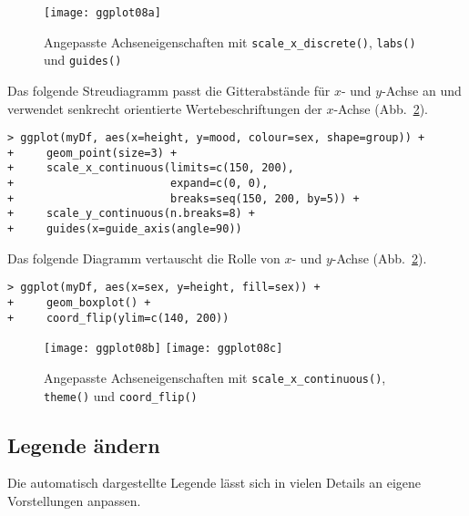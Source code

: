 \begin{figure}[ht]
\centering
\texttt{[image: ggplot08a]}
\vspace*{-0.5em}
\caption{Angepasste Achseneigenschaften mit \lstinline!scale_x_discrete()!, \lstinline!labs()! und \lstinline!guides()!}
\label{fig:ggplot08a}
\end{figure}

Das folgende Streudiagramm passt die Gitterabstände für $x$- und $y$-Achse an und verwendet senkrecht orientierte Wertebeschriftungen der $x$-Achse  (Abb.\ \ref{fig:ggplot08bc}).
\begin{lstlisting}
> ggplot(myDf, aes(x=height, y=mood, colour=sex, shape=group)) +
+     geom_point(size=3) +
+     scale_x_continuous(limits=c(150, 200),
+                        expand=c(0, 0),
+                        breaks=seq(150, 200, by=5)) +
+     scale_y_continuous(n.breaks=8) +
+     guides(x=guide_axis(angle=90))
\end{lstlisting}

Das folgende Diagramm vertauscht die Rolle von $x$- und $y$-Achse (Abb.\ \ref{fig:ggplot08bc}).
\begin{lstlisting}
> ggplot(myDf, aes(x=sex, y=height, fill=sex)) +
+     geom_boxplot() +
+     coord_flip(ylim=c(140, 200))
\end{lstlisting}

\begin{figure}[ht]
\centering
\texttt{[image: ggplot08b]}
\texttt{[image: ggplot08c]}
\vspace*{-0.5em}
\caption{Angepasste Achseneigenschaften mit \lstinline!scale_x_continuous()!, \lstinline!theme()! und \lstinline!coord_flip()!}
\label{fig:ggplot08bc}
\end{figure}

\subsection{Legende ändern}
\label{sec:ggplotLegend}

Die automatisch dargestellte Legende lässt sich in vielen Details an eigene Vorstellungen anpassen.

